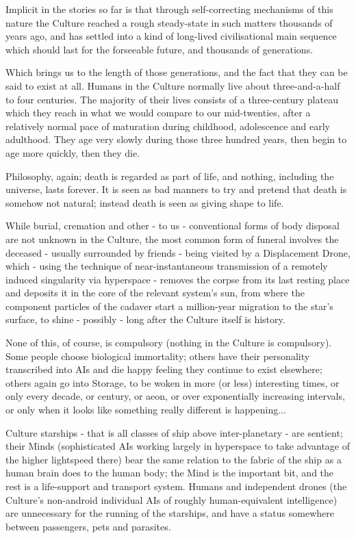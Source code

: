 Implicit in the stories so far is that through self-correcting mechanisms of this nature the Culture reached a rough steady-state in such matters thousands of years ago, and has settled into a kind of long-lived civilisational main sequence which should last for the forseeable future, and thousands of generations.

Which brings us to the length of those generations, and the fact that they can be said to exist at all. Humans in the Culture normally live about three-and-a-half to four centuries. The majority of their lives consists of a three-century plateau which they reach in what we would compare to our mid-twenties, after a relatively normal pace of maturation during childhood, adolescence and early adulthood. They age very slowly during those three hundred years, then begin to age more quickly, then they die.

Philosophy, again; death is regarded as part of life, and nothing, including the universe, lasts forever. It is seen as bad manners to try and pretend that death is somehow not natural; instead death is seen as giving shape to life.

While burial, cremation and other - to us - conventional forms of body disposal are not unknown in the Culture, the most common form of funeral involves the deceased - usually surrounded by friends - being visited by a Displacement Drone, which - using the technique of near-instantaneous transmission of a remotely induced singularity via hyperspace - removes the corpse from its last resting place and deposits it in the core of the relevant system's sun, from where the component particles of the cadaver start a million-year migration to the star's surface, to shine - possibly - long after the Culture itself is history.

None of this, of course, is compulsory (nothing in the Culture is compulsory). Some people choose biological immortality; others have their personality transcribed into AIs and die happy feeling they continue to exist elsewhere; others again go into Storage, to be woken in more (or less) interesting times, or only every decade, or century, or aeon, or over exponentially increasing intervals, or only when it looks like something really different is happening...

Culture starships - that is all classes of ship above inter-planetary - are sentient; their Minds (sophisticated AIs working largely in hyperspace to take advantage of the higher lightspeed there) bear the same relation to the fabric of the ship as a human brain does to the human body; the Mind is the important bit, and the rest is a life-support and transport system. Humans and independent drones (the Culture's non-android individual AIs of roughly human-equivalent intelligence) are unnecessary for the running of the starships, and have a status somewhere between passengers, pets and parasites.

